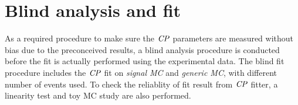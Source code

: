 \section{Blind analysis and fit}
As a required procedure to make sure the $\it{CP}$ parameters are measured without bias due to the preconceived results, a blind analysis procedure is conducted before the fit is actually performed using the experimental data. The blind fit procedure includes the $\it{CP}$ fit on \textit{signal MC} and \textit{generic MC}, with different number of events used. To check the reliablity of fit result from $\it{CP}$ fitter, a linearity test and toy MC study are also performed. 

